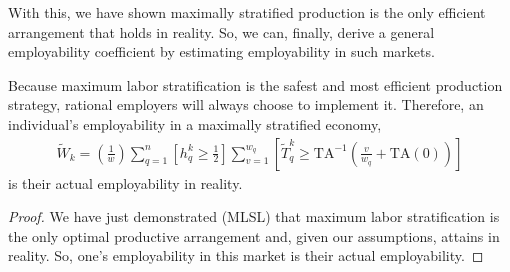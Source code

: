 \documentclass[hidelinks, nonatbib]{elsarticle}
\begin{document}
With this, we have shown maximally stratified production is the only efficient arrangement that holds in reality. So, we can, finally, derive a general employability coefficient by estimating employability in such markets.
\begin{get_theorem}[GET]
    Because maximum labor stratification is the safest and most efficient production strategy, rational employers will always choose to implement it. Therefore, an individual's employability in a maximally stratified economy,
    \begin{gather}
        \tilde{W}_k 
        =
        \left(
            \frac{1}{w}
        \right)
        \sum_{q=1}^{n}
        \left[
            h_{q}^{k}
            \geq
            \frac{1}{2}
        \right]
        \sum_{v=1}^{w_q}
        \left[
            \tilde{T}_{q}^{k}
            \geq
            \text{TA}^{-1}
            \left(
                \frac{v}{w_q}
                +
                \text{TA}(0)
            \right)
        \right]
    \end{gather}
    is their actual employability in reality.
    \begin{proof}
        We have just demonstrated (MLSL) that maximum labor stratification is the only optimal productive arrangement and, given our assumptions, attains in reality. So, one's employability in this market is their actual employability.


\end{proof}
\end{get_theorem}
\end{document}
